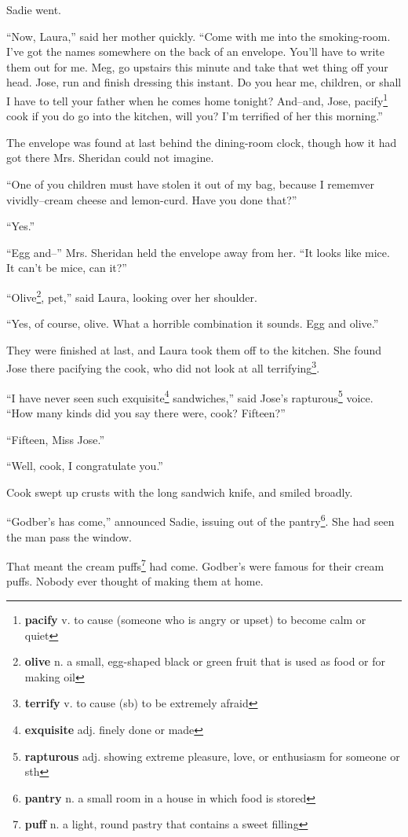 Sadie went.

``Now, Laura,'' said her mother quickly. ``Come with me into the smoking-room. I've got the names somewhere on the back of an envelope. You'll have to write them out for me. Meg, go upstairs this minute and take that wet thing off your head. Jose, run and finish dressing this instant. Do you hear me, children, or shall I have to tell your father when he comes home tonight? And--and, Jose, pacify\footnote{\textbf{pacify} v. to cause (someone who is angry or upset) to become calm or quiet} cook if you do go into the kitchen, will you? I'm terrified of her this morning.''

The envelope was found at last behind the dining-room clock, though how it had got there Mrs. Sheridan could not imagine.

``One of you children must have stolen it out of my bag, because I rememver vividly--cream cheese and lemon-curd. Have you done that?''

``Yes.''

``Egg and--'' Mrs. Sheridan held the envelope away from her. ``It looks like mice. It can't be mice, can it?''

``Olive\footnote{\textbf{olive} n. a small, egg-shaped black or green fruit that is used as food or for making oil}, pet,'' said Laura, looking over her shoulder.

``Yes, of course, olive. What a horrible combination it sounds. Egg and olive.''

They were finished at last, and Laura took them off to the kitchen. She found Jose there pacifying the cook, who did not look at all terrifying\footnote{\textbf{terrify} v. to cause (sb) to be extremely afraid}.

``I have never seen such exquisite\footnote{\textbf{exquisite} adj. finely done or made} sandwiches,'' said Jose's rapturous\footnote{\textbf{rapturous} adj. showing extreme pleasure, love, or enthusiasm for someone or sth} voice. ``How many kinds did you say there were, cook? Fifteen?''

``Fifteen, Miss Jose.''

``Well, cook, I congratulate you.''

Cook swept up crusts with the long sandwich knife, and smiled broadly.

``Godber's has come,'' announced Sadie, issuing out of the pantry\footnote{\textbf{pantry} n. a small room in a house in which food is stored}. She had seen the man pass the window.

That meant the cream puffs\footnote{\textbf{puff} n. a light, round pastry that contains a sweet filling} had come. Godber's were famous for their cream puffs. Nobody ever thought of making them at home.

